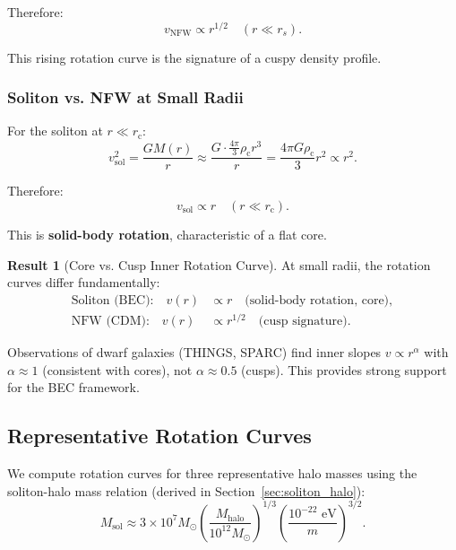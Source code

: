 \documentclass[11pt,a4paper]{article}
\newcommand{\Msun}{\ensuremath{M_\odot}}
\newcommand{\Msol}{\ensuremath{M_{\mathrm{sol}}}}
\newcommand{\Mhalo}{\ensuremath{M_{\mathrm{halo}}}}
\newcommand{\rc}{\ensuremath{r_{\mathrm{c}}}}
\newcommand{\rhoc}{\ensuremath{\rho_{\mathrm{c}}}}
\theoremstyle{definition}
\newtheorem{result}{Result}[section]
\theoremstyle{remark}
\begin{document}
Therefore:
\begin{equation}
v_{\mathrm{NFW}} \propto r^{1/2} \quad (r \ll r_s).
\end{equation}

This rising rotation curve is the signature of a cuspy density profile.

\subsubsection{Soliton vs. NFW at Small Radii}

For the soliton at $r \ll \rc$:
\begin{equation}
v_{\mathrm{sol}}^2 = \frac{G M(r)}{r} \approx \frac{G \cdot \frac{4\pi}{3}\rhoc r^3}{r} = \frac{4\pi G\rhoc}{3} r^2 \propto r^2.
\end{equation}

Therefore:
\begin{equation}
v_{\mathrm{sol}} \propto r \quad (r \ll \rc).
\end{equation}

This is \textbf{solid-body rotation}, characteristic of a flat core.

\begin{result}[Core vs. Cusp Inner Rotation Curve]
At small radii, the rotation curves differ fundamentally:
\begin{equation}
\boxed{
\begin{aligned}
\text{Soliton (BEC):} \quad v(r) &\propto r \quad \text{(solid-body rotation, core)}, \\
\text{NFW (CDM):} \quad v(r) &\propto r^{1/2} \quad \text{(cusp signature)}.
\end{aligned}
}
\end{equation}

Observations of dwarf galaxies (THINGS, SPARC) find inner slopes $v \propto r^{\alpha}$ with $\alpha \approx 1$ (consistent with cores), not $\alpha \approx 0.5$ (cusps). This provides strong support for the BEC framework.
\end{result}

\subsection{Representative Rotation Curves}
\label{sec:representative}

We compute rotation curves for three representative halo masses using the soliton-halo mass relation (derived in Section~\ref{sec:soliton_halo}):
\begin{equation}
\Msol \approx 3 \times 10^7 \Msun \left(\frac{\Mhalo}{10^{12} \Msun}\right)^{1/3} \left(\frac{10^{-22}\text{ eV}}{m}\right)^{3/2}.
\end{equation}
\end{document}
